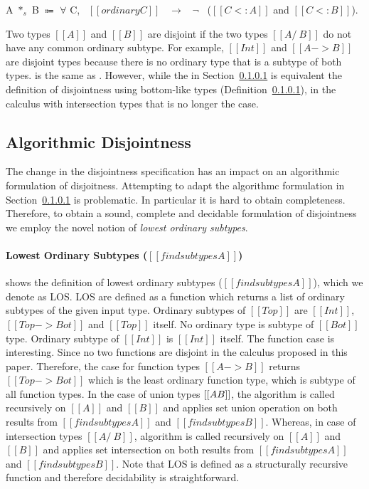 \begin{definition}
\label{def:inter:disj}
  A $*_s$ B $\Coloneqq$ $\forall$ C, \ $[[ordinary C]]$ \ $\rightarrow$ \ $\neg$ \ ($[[C <: A]]$ and $[[C <: B]]$).
\end{definition}

\noindent Two types $[[A]]$ and $[[B]]$ are
disjoint if the two types $[[A /\ B]]$ do
not have any common ordinary subtype. For example, $[[Int]]$ and $[[A -> B]]$
are disjoint types because there is no ordinary type that is a subtype
of both types.   is the same as 
. However, while the  in Section~\ref{}
is equivalent the definition of disjointness using bottom-like types (Definition~\ref{}),
in the calculus with intersection types that is no longer the case. 

\subsection{Algorithmic Disjointness}

The change in the disjointness specification has an impact on an algorithmic
formulation of disjoitness. Attempting to adapt the algorithmc formulation
in Section~\ref{} is problematic. In particular it is hard to obtain
completeness. Therefore, to obtain a sound, complete and decidable
formulation of disjointness we employ the novel notion of
\emph{lowest ordinary subtypes}.

\paragraph{Lowest Ordinary Subtypes ($[[findsubtypes A]]$)}
 shows the definition of
lowest ordinary subtypes ($[[findsubtypes A]]$), which we denote as LOS.
LOS are defined as a function which
returns a list of ordinary subtypes of the given input type.  Ordinary
subtypes of $[[Top]]$ are $[[Int]]$, $[[Top -> Bot]]$ and $[[Top]]$
itself. No ordinary type is subtype of $[[Bot]]$ type. Ordinary
subtype of $[[Int]]$ is $[[Int]]$ itself. The function case is
interesting. Since no two functions are disjoint in the calculus
proposed in this paper.
Therefore, the case for function types $[[A -> B]]$ returns $[[Top
    -> Bot]]$ which is the least ordinary function type, which is subtype
of all function types. In the case of union types $[[A \/ B]]$, the
algorithm is called recursively on $[[A]]$ and $[[B]]$ and applies set union
operation on both results from $[[findsubtypes A]]$ and
$[[findsubtypes B]]$. Whereas, in case of intersection types $[[A
    /\ B]]$, algorithm is called recursively on $[[A]]$ and $[[B]]$
and applies set intersection on both results from
$[[findsubtypes A]]$ and $[[findsubtypes B]]$.
Note that LOS is defined as a structurally recursive function and therefore
decidability is straightforward.


